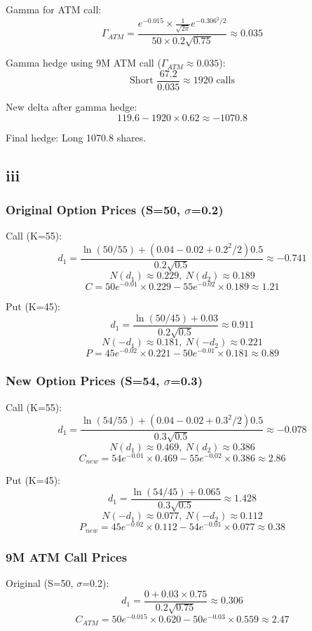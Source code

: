\documentclass{article}
\begin{document}
Gamma for ATM call:
\[
    \Gamma_{ATM} = \frac{e^{-0.015}\times\frac{1}{\sqrt{2\pi}}e^{-0.306^2/2}}{50\times0.2\sqrt{0.75}} \approx 0.035
\]

Gamma hedge using 9M ATM call ($\Gamma_{ATM}\approx0.035$):
\[
    \text{Short } \frac{67.2}{0.035} \approx 1920 \text{ calls}
\]

New delta after gamma hedge:
\[
    119.6 - 1920\times0.62 \approx -1070.8
\]

Final hedge: Long 1070.8 shares.

\subsection{iii}
\subsubsection*{Original Option Prices (S=50, $\sigma$=0.2)}

Call (K=55):
\[
    d_1 = \frac{\ln(50/55)+(0.04-0.02+0.2^2/2)0.5}{0.2\sqrt{0.5}} \approx -0.741
\]
\[
    N(d_1) \approx 0.229,\ N(d_2) \approx 0.189
\]
\[
    C = 50e^{-0.01}\times0.229 - 55e^{-0.02}\times0.189 \approx 1.21
\]

Put (K=45):
\[
    d_1 = \frac{\ln(50/45)+0.03}{0.2\sqrt{0.5}} \approx 0.911
\]
\[
    N(-d_1) \approx 0.181,\ N(-d_2) \approx 0.221
\]
\[
    P = 45e^{-0.02}\times0.221 - 50e^{-0.01}\times0.181 \approx 0.89
\]

\subsubsection*{New Option Prices (S=54, $\sigma$=0.3)}

Call (K=55):
\[
    d_1 = \frac{\ln(54/55)+(0.04-0.02+0.3^2/2)0.5}{0.3\sqrt{0.5}} \approx -0.078
\]
\[
    N(d_1) \approx 0.469,\ N(d_2) \approx 0.386
\]
\[
    C_{new} = 54e^{-0.01}\times0.469 - 55e^{-0.02}\times0.386 \approx 2.86
\]

Put (K=45):
\[
    d_1 = \frac{\ln(54/45)+0.065}{0.3\sqrt{0.5}} \approx 1.428
\]
\[
    N(-d_1) \approx 0.077,\ N(-d_2) \approx 0.112
\]
\[
    P_{new} = 45e^{-0.02}\times0.112 - 54e^{-0.01}\times0.077 \approx 0.38
\]

\subsubsection*{9M ATM Call Prices}

Original (S=50, $\sigma$=0.2):
\[
    d_1 = \frac{0+0.03\times0.75}{0.2\sqrt{0.75}} \approx 0.306
\]
\[
    C_{ATM} = 50e^{-0.015}\times0.620 - 50e^{-0.03}\times0.559 \approx 2.47
\]
\end{document}
